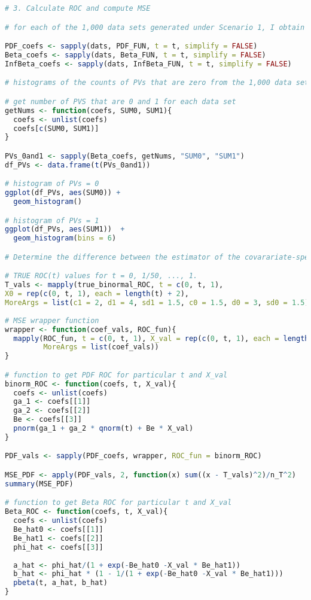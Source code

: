 \documentclass{article}
\begin{document}
\begin{lstlisting}[language=R]
# 3. Calculate ROC and compute MSE

# for each of the 1,000 data sets generated under Scenario 1, I obtain the regression coefficients using the three different methods.

PDF_coefs <- sapply(dats, PDF_FUN, t = t, simplify = FALSE)
Beta_coefs <- sapply(dats, Beta_FUN, t = t, simplify = FALSE)
InfBeta_coefs <- sapply(dats, InfBeta_FUN, t = t, simplify = FALSE)

# histograms of the counts of PVs that are zero from the 1,000 data sets.

# get number of PVS that are 0 and 1 for each data set
getNums <- function(coefs, SUM0, SUM1){
  coefs <- unlist(coefs)
  coefs[c(SUM0, SUM1)]
}

PVs_0and1 <- sapply(Beta_coefs, getNums, "SUM0", "SUM1")
df_PVs <- data.frame(t(PVs_0and1))

# histogram of PVs = 0
ggplot(df_PVs, aes(SUM0)) +
  geom_histogram()

# histogram of PVs = 1
ggplot(df_PVs, aes(SUM1))  +
  geom_histogram(bins = 6)

# Determine the difference between the estimator of the covarariate-specific ROC curve and the true ROC curve, I calculate the MSE (defined in the 2011 paper)

# TRUE ROC(t) values for t = 0, 1/50, ..., 1.
T_vals <- mapply(true_binormal_ROC, t = c(0, t, 1), 
X0 = rep(c(0, t, 1), each = length(t) + 2),
MoreArgs = list(c1 = 2, d1 = 4, sd1 = 1.5, c0 = 1.5, d0 = 3, sd0 = 1.5))
                               
# MSE wrapper function
wrapper <- function(coef_vals, ROC_fun){
  mapply(ROC_fun, t = c(0, t, 1), X_val = rep(c(0, t, 1), each = length(t) + 2),
         MoreArgs = list(coef_vals))
}

# function to get PDF ROC for particular t and X_val
binorm_ROC <- function(coefs, t, X_val){
  coefs <- unlist(coefs)
  ga_1 <- coefs[[1]]
  ga_2 <- coefs[[2]]
  Be <- coefs[[3]]
  pnorm(ga_1 + ga_2 * qnorm(t) + Be * X_val)
}

PDF_vals <- sapply(PDF_coefs, wrapper, ROC_fun = binorm_ROC)

MSE_PDF <- apply(PDF_vals, 2, function(x) sum((x - T_vals)^2)/n_T^2)
summary(MSE_PDF) 

# function to get Beta ROC for particular t and X_val
Beta_ROC <- function(coefs, t, X_val){
  coefs <- unlist(coefs)
  Be_hat0 <- coefs[[1]]
  Be_hat1 <- coefs[[2]]
  phi_hat <- coefs[[3]]
  
  a_hat <- phi_hat/(1 + exp(-Be_hat0 -X_val * Be_hat1))
  b_hat <- phi_hat * (1 - 1/(1 + exp(-Be_hat0 -X_val * Be_hat1)))
  pbeta(t, a_hat, b_hat)
}


\end{lstlisting}
\end{document}
